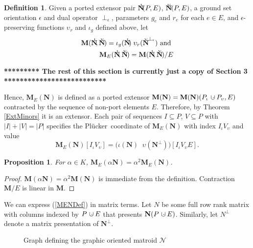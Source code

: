 \documentclass[12pt]{article}
\newtheorem{proposition}[theorem]{Proposition}
\theoremstyle{definition}
\newtheorem{definition}[theorem]{Definition}
\newcommand{\dunion}
{\mbox{\hbox{\hskip6pt$\cdot$\hskip-5.50pt$\cup$\hskip2pt}}}
\newcommand{\epsilonfun}{\ensuremath{\epsilon}}
\newcommand{\Is}{\ensuremath{\iota}}
\newcommand{\Vs}{\ensuremath{\upsilon}}
\newcommand{\FieldK}{\ensuremath{K}}
\newcommand{\ext}[1]{\ensuremath{\mathbf{#1}}}
\newcommand{\Plucker}{Pl\"{u}cker\ }
\newcommand{\NI}{\ensuremath{N^{\raisebox{2pt}{\tiny\hspace{-5.2pt}I}}}}
\newcommand{\NV}{\ensuremath{N^{\raisebox{2pt}{\tiny\hspace{-6.6pt}V}}}}
\begin{document}
\begin{definition}
\label{PairsDefM}
Given 
a ported extensor pair \(\ext{\NI}(P,E)\),
 \(\ext{\NV}(P,E)\),
a ground set orientation \(\epsilonfun\) and dual operator
$\perp_\epsilon$,
parameters \(g_e\) and \(r_e\) for each 
\(e\in E\), and 
\(\epsilonfun\)-preserving functions $\Vs_r$ and $\Is_g$ defined 
above, let
\begin{equation}
\begin{split}
\label{PairsMENDef}
\ext{M}(\ext{\NI},\ext{\NV}) = \Is_{g}(\ext{\NI})\;\Vs_{r}(\ext{\NV}^{\perp_\epsilon})
\text{ and }\\
\ext{M}_E(\ext{\NI},\ext{\NV}) =
 \ext{M}(\ext{\NI},\ext{\NV})/E
\end{split}
\end{equation}
\end{definition}

\noindent
{\bf **********  The rest of this section is currently just
a copy of Section 3 **************************}

Hence, $\ext{M}_E(\ext{N})$ is defined as a ported extensor
$\ext{M}(\ext{N})=\ext{M}(\ext{N})(P_\Is\dunion P_\Vs,E)$ 
contracted by the sequence 
of non-port elements $E$.  Therefore, 
by Theorem \ref{ExtMinors}
it is an extensor.  
Each pair of sequences
$I\subseteq P$, $V\subseteq P$ with $|I|+|V|=|P|$
specifies the \Plucker coordinate
of $\ext{M}_E(\ext{N})$ 
with index $I_\Is V_\Vs$ and value 
\begin{equation}
\label{PairsMENComponentDef}
\ext{M}_E(\ext{N})[I_{\Is}V_{\Vs}] 
      = \big(\Is(\ext{N})\;\;\Vs(\ext{N}^\perp)\big)[I_{\Is}V_{\Vs}E].
\end{equation}

\begin{proposition} 
\label{PairsPropostionAlphaSquared}
For $\alpha\in\FieldK$, 
$\ext{M}_E(\alpha \ext{N}) = \alpha^2 \ext{M}_E(\ext{N})$.
\end{proposition}
\begin{proof} 
$\ext{M}(\alpha \ext{N}) = \alpha^2 \ext{M}(\ext{N})$ is immediate
from the definition. Contraction $\ext{M}/E$ is linear in 
$\ext{M}$.
\end{proof}



We can express  (\ref{MENDef}) in matrix terms.
Let $N$ be some full row rank matrix with columns indexed
by $P\dunion E$ that presents $\ext{N}(P\dunion E)$.
Similarly, let $N^{\perp}$ denote a matrix presentation
of $\ext{N}^{\perp}$.

\begin{figure}
\begin{center}\end{center}
\caption{Graph defining the graphic oriented matroid $\mathcal{N}$}
\label{PairsK4figure}
\end{figure}
\end{document}
